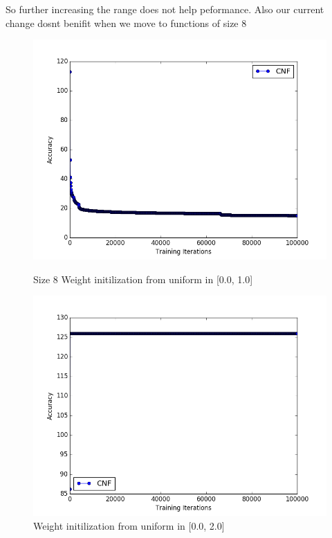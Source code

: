 \documentclass{article}
\theoremstyle{definition}
\begin{document}
So further increasing the range does not help peformance. Also our current change dosnt benifit when we move to functions of size 8

\begin{figure}[H]
\centering
  \begin{minipage}[b]{0.4\textwidth}
    \includegraphics[width=\textwidth]{CNF-LD-WI-06.png}
    \caption{Size 8 Weight initilization from uniform in [0.0, 1.0]}
  \end{minipage}
  \hfill
  \begin{minipage}[b]{0.4\textwidth}
    \includegraphics[width=\textwidth]{CNF-LD-WI-05.png}
    \caption{Weight initilization from uniform in [0.0, 2.0]}
  \end{minipage}
\end{figure}
\end{document}
